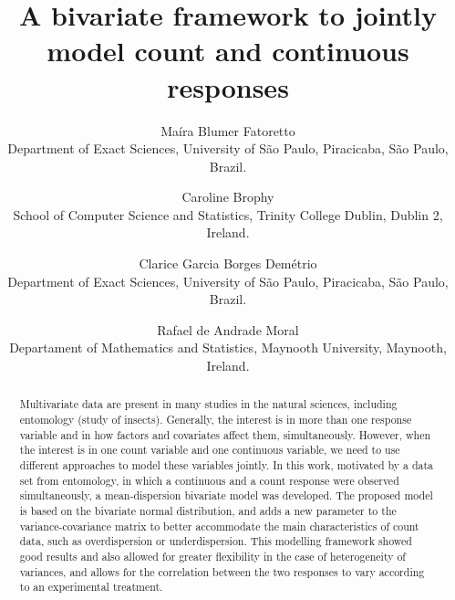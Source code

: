 \documentclass[useAMS,referee]{biom}
\title[A bivariate framework to jointly model count and continuous responses]{A bivariate framework to jointly model count and continuous responses}
\author
{Maíra Blumer Fatoretto\emailx{mairafatoretto@gmail.com} \\
Department of Exact Sciences, University of São Paulo, Piracicaba, São Paulo, Brazil.
\and
Caroline Brophy\emailx{caroline.brophy@tcd.ie} \\
School of Computer Science and Statistics, Trinity College Dublin, Dublin 2, Ireland.
\and
Clarice Garcia Borges Demétrio\emailx{clarice.demetrio@usp.br} \\
Department of Exact Sciences, University of São Paulo, Piracicaba, São Paulo, Brazil.
\and
Rafael de Andrade Moral\emailx{Rafael.DeAndradeMoral@mu.ie} \\
Departament of Mathematics and Statistics, Maynooth University, Maynooth, Ireland.}
\begin{document}







\label{firstpage}


\begin{abstract}
Multivariate data are present in many studies in the natural sciences, including entomology (study of insects). Generally, the interest is in more than one response variable and in how factors and covariates affect them, simultaneously. However, when the interest is in one count variable and one continuous variable, we need to use different approaches to model these variables jointly. In this work, motivated by a data set from ​​entomology, in which a continuous and a count response were observed simultaneously, a mean-dispersion bivariate model was developed. The proposed model is based on the bivariate normal  distribution, and adds a new parameter to the variance-covariance matrix to better accommodate the main characteristics of count data, such as overdispersion or underdispersion. This modelling framework showed good results and also allowed for greater flexibility in the case of heterogeneity of variances, and allows for the correlation between the two responses to vary according to an experimental treatment.
\end{abstract}
\end{document}
